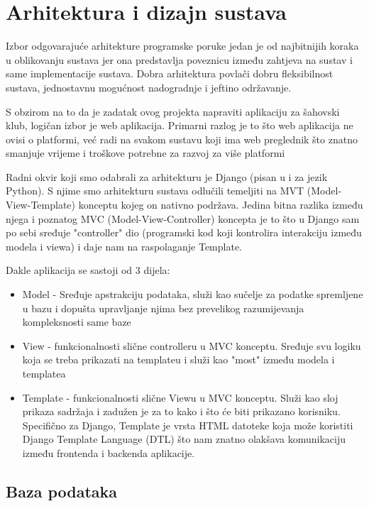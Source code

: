 \chapter{Arhitektura i dizajn sustava}
		 Izbor odgovarajuće arhitekture programske poruke jedan je od najbitnijih koraka u oblikovanju sustava jer ona predstavlja poveznicu između zahtjeva na sustav i same implementacije sustava. Dobra arhitektura povlači dobru fleksibilnost sustava, jednostavnu mogućnost nadogradnje i jeftino održavanje.
		

\noindent S obzirom na to da je zadatak ovog projekta napraviti aplikaciju za šahovski klub, logičan izbor je web aplikacija. Primarni razlog je to što web aplikacija ne ovisi o platformi, već radi na svakom sustavu koji ima web preglednik što znatno smanjuje vrijeme i troškove potrebne za razvoj za više platformi
		

\noindent Radni okvir koji smo odabrali za arhitekturu je Django (pisan u i za jezik Python). S njime smo arhitekturu sustava odlučili temeljiti na MVT (Model-View-Template) konceptu kojeg on nativno podržava. Jedina bitna razlika između njega i poznatog MVC (Model-View-Controller) koncepta je to što u Django sam po sebi sređuje "controller" dio (programski kod koji kontrolira interakciju između modela i viewa) i daje nam na raspolaganje Template.
		
		Dakle aplikacija se sastoji od 3 dijela:
		\begin{itemize}
			\item 	Model - Sređuje apstrakciju podataka, služi kao sučelje za podatke spremljene u bazu i dopušta upravljanje njima bez prevelikog razumijevanja kompleksnosti same baze 
			\item 	View - funkcionalnosti slične controlleru u MVC konceptu. Sređuje svu logiku koja se treba prikazati na templateu i služi kao "most" između modela i templatea
			\item 	Template - funkcionalnosti slične Viewu u MVC konceptu. Služi kao sloj prikaza sadržaja i zadužen je za to kako i što će biti prikazano korisniku. Specifično za Django, Template je vrsta HTML datoteke koja može koristiti Django Template Language (DTL) što nam znatno olakšava komunikaciju između frontenda i backenda aplikacije.	
		\end{itemize}
		

				
		\section{Baza podataka}
		
